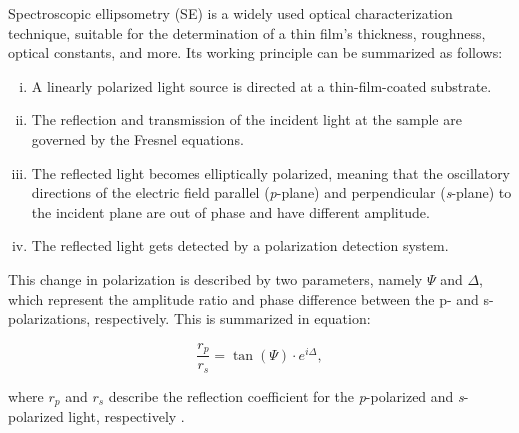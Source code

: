 Spectroscopic ellipsometry (SE) is a widely used optical characterization technique, suitable for the determination of a thin film's thickness, roughness, optical constants, and more. Its working principle can be summarized as follows: 

\begin{enumerate}[i.]
  \item A linearly polarized light source is directed at a thin-film-coated substrate.
  \item The reflection and transmission of the incident light at the sample are governed by the Fresnel equations.
  \item The reflected light becomes elliptically polarized, meaning that the oscillatory directions of the electric field parallel (\textit{p}-plane) and perpendicular (\textit{s}-plane) to the incident plane are out of phase and have different amplitude.
  \item The reflected light gets detected by a polarization detection system.
\end{enumerate}

This change in polarization is described by two parameters, namely $\Psi$ and $\Delta$, which represent the amplitude ratio and phase difference between the p- and s-polarizations, respectively. This is summarized in equation: 

\begin{equation}
\frac{r_p}{r_s} = \tan(\Psi) \cdot e^{i\Delta},
\label{eq:ellipsometry}
\end{equation}

where $r_p$ and $r_s$ describe the reflection coefficient for the \textit{p}-polarized and \textit{s}-polarized light, respectively \cite{Fujiwara2018SpectroscopicCharacterization}.

